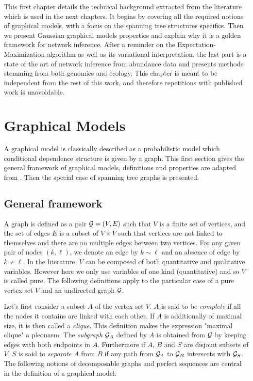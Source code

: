 
\vspace{1cm}
This first chapter  details the technical background extracted from the literature which is used in the next chapters. It begins by covering all the required notions of graphical models, with a  focus on the spanning tree structures specifics. Then we present Gaussian graphical models properties and explain why it is a golden framework for network inference. After a reminder on the Expectation-Maximization algorithm as well as its variational interpretation, the last part is a state of the art of network inference from abundance data and presents methods stemming from both genomics and ecology. This chapter is meant to be independent from the rest of this work, and therefore repetitions with published work is unavoidable.


 \section{Graphical Models}
 A graphical model is classically described as a probabilistic model which conditional dependence structure is given by a graph. This first section gives the general framework of graphical models, definitions and properties are adapted from \citet{Lau96}.  Then the special case of  spanning tree graphs is presented.
 \subsection{General framework}
 A graph is defined as a pair $\mathcal{G}=(V,E)$ such that $V$ is a finite set of vertices, and the set of edges $E$ is a subset of $V\times V$ such that vertices are not linked to themselves and there are no multiple edges between two vertices. For any given pair of nodes $(k,\ell)$, we denote an edge by $k\sim\ell$ and an absence of edge by $k\nsim \ell$. In the literature, $V$ can be composed of both quantitative and qualitative variables. However here we  only use variables of one kind (quantitative) and so $V$ is called pure. The following definitions apply to the particular case of a pure vertex set $V$ and an undirected graph $\mathcal{G}$.

Let's first consider a subset $A$ of the vertex set $V$. $A$ is said to be \textit{complete} if all the nodes it contains are linked with each other. If $A$ is additionally of maximal size, it is then called a \textit{clique}. This definition makes the expression "maximal clique" a pleonasm. The \textit{subgraph} $\mathcal{G}_A$ defined by $A$  is obtained from $\mathcal{G}$ by keeping edges with both endpoints in $A$. Furthermore if $A$, $B$ and $S$ are disjoint subsets of $V$, $S$ is said to \textit{separate} $A$ from $B$ if any path from $\mathcal{G}_A$ to $\mathcal{G}_B$ intersects with $\mathcal{G}_S$. The following notions of decomposable graphs and perfect sequences are central in the definition of a graphical model.
 
